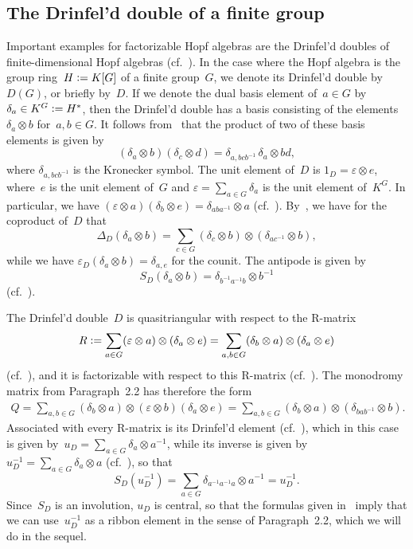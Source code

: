 \documentclass[12pt]{article}
\theoremstyle{definition}
\theoremstyle{break}
\renewcommand{\1}{\mathbbm{1}}
\newcommand{\ot}{\mathbin{\otimes}}
\newcommand{\deq}{\vcentcolon =}
\begin{document}
\subsection{The Drinfel'd double of a finite group} \label{DrinfDoub}
Important examples for factorizable Hopf algebras are the Drinfel'd doubles of finite-dimensional Hopf algebras (cf.~\cite[Def.~IX.4.1, p.~213]{Ka}). In the case where the Hopf algebra is the group ring~$H \deq K[G]$ of a finite group~$G$, we denote its Drinfel'd double by~$D(G)$, or briefly by~$D$. If we denote the dual basis element of~$a \in G$ by $\delta_a \in K^G \deq H^*$, then the Drinfel'd double has a basis consisting of the elements $\delta_{a} \ot b$ for~$a, b \in G$. It follows from~\cite[Lem.~IX.4.2, p.~214]{Ka} that the product of two of these basis elements is given by
\[(\delta_a \ot b)(\delta_c \ot d) = \delta_{a, b c b^{-1}} \, \delta_a \ot b d,\] 
where $\delta_{a, b c b^{-1}}$ is the Kronecker symbol. The unit element of~$D$ is $1_{D} = \varepsilon \ot e$, where~$e$ is the unit element of~$G$ and $\varepsilon = \sum_{a\in G} \delta_a$ is the unit element of~$K^G$. In particular, we have  
$(\varepsilon \ot a)(\delta_b \ot e) = \delta_{aba^{-1}} \ot a$ (cf.~\cite[Eq.~(4.11), p.~219]{Ka}). By~\cite[Eq.~(4.2), p.~214]{Ka}, we have for the coproduct of~$D$ that
\[\Delta_{D}(\delta_a \ot b) = \sum_{c \in G}(\delta_c \ot b) \ot (\delta_{ac^{-1}} \ot b),\]
while we have $\varepsilon_{D}(\delta_a \ot b) = \delta_{a,e}$ for the counit. The antipode is given by \[S_{D}(\delta_a \ot b) = \delta_{b^{-1} a^{-1} b} \ot b^{-1}\]
(cf.~\cite[Par.~2.2, p.~17]{SZ}).

The Drinfel'd double~$D$ is quasitriangular with respect to the \mbox{R-matrix} 
\[R \deq \sum_{a \in G} (\varepsilon \ot a) \ot (\delta_a \ot e) 
= \sum_{a,b \in G} (\delta_b \ot a) \ot (\delta_a \ot e)\]
(cf.~\cite[Eq.~(4.12), p.~220]{Ka}), and it is factorizable with respect to this R-matrix (cf.~\cite[Prop.~3.3, p.~28]{SZ}). The monodromy matrix from Paragraph~2.2 has therefore the form
\begin{align*}
Q = \sum_{a,b \in G} (\delta_b \ot a) \ot (\varepsilon \ot b) (\delta_a \ot e) 
= \sum_{a,b \in G} (\delta_b \ot a) \ot (\delta_{bab^{-1}} \ot b).                                                                                                                                                                                                                                                                                                                    \end{align*}
Associated with every R-matrix is its Drinfel'd element (cf.~\cite[Eq.~(4.1), p.~180]{Ka}), which in this case is given by~$u_D = \sum_{a \in G} \delta_a \ot a^{-1}$, while its inverse is given by~\mbox{$u_D^{-1} = \sum_{a \in G} \delta_a \ot a$}
(cf.~\cite[Par.~2.2, p.~18]{SZ}), so that 
\[S_D(u_D^{-1}) = \sum_{a \in G} \delta_{a^{-1} a^{-1} a} \ot a^{-1} = u_D^{-1}. \]
Since~$S_D$ is an involution, $u_D$ is central, so that the formulas given in~\cite[Par.~2.1, p.~17]{SZ} imply that we can use~$u_D^{-1}$ as a ribbon element in the sense of Paragraph~2.2, which we will do in the sequel.
\end{document}
